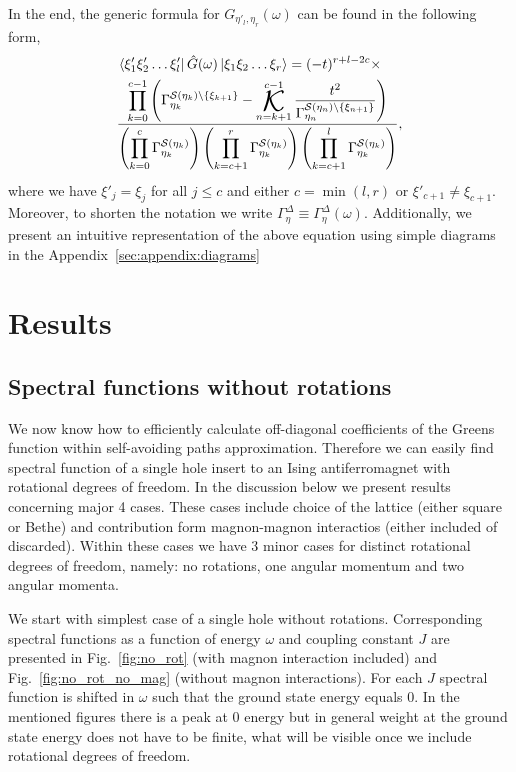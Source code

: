 \documentclass[%
 reprint,
 amsmath,amssymb,
 aps,
prb,
floatfix,
]{revtex4-1}
\newcommand{\ket}[1]{\left\vert #1 \right\rangle}
\newcommand{\bra}[1]{\left\langle #1 \right\vert}
\def\K{%
    \operatornamewithlimits{%
        \mathchoice{%
            \vcenter{\hbox{\huge $\mathcal{K}$}}%
        }{%
            \vcenter{\hbox{\Large $\mathcal{K}$}}%
        }{%
            \mathrm{\mathcal{K}}%
        }{%
            \mathrm{\mathcal{K}}%
        }
    }
}
\begin{document}
In the end, the generic formula for $G_{\eta'_l, \eta_r}(\omega)$ can be found in the following form, 
\begin{equation}\label{eq:GFcoef}
	\begin{split}
		&\bra{\xi'_1 \xi'_2 \hdots \xi'_l}
		\hat{G}(\omega)
		\ket{\xi_1 \xi_2 \hdots \xi_r} = (-t)^{r + l - 2c} \times \\
		&\frac{\displaystyle
		\prod_{k=0}^{c-1} \left(
			\Gamma_{\eta_k}^{\mathcal{S}(\eta_k)\setminus\{\xi_{k+1}\}} - \K_{n=k+1}^{c-1} \frac{t^2}{\Gamma_{\eta_n}^{\mathcal{S}(\eta_n)\setminus\{\xi_{n+1}\}}}
		\right)
		}{\displaystyle
		\left(
			\prod_{k=0}^{c} \Gamma_{\eta_k}^{\mathcal{S}(\eta_k)}
		\right)
		\left(
			\prod_{k=c+1}^{r} \Gamma_{\eta_k}^{\mathcal{S}(\eta_k)}
		\right)
		\left(
			\prod_{k=c+1}^{l} \Gamma_{\eta_k}^{\mathcal{S}(\eta_k)}
		\right)
		},    
	\end{split}
\end{equation}
where we have $\xi'_j = \xi_j$ for all $j \leq c$ and either $c = \min(l,r)$ or $\xi'_{c+1} \neq \xi_{c+1}$. Moreover, to shorten the notation we write $\Gamma_\eta^\Delta \equiv \Gamma_\eta^\Delta(\omega)$. Additionally, we present an intuitive representation of the above equation using simple diagrams in the Appendix~\ref{sec:appendix:diagrams}

\section{\label{sec:results}Results}

\subsection{\label{sec:results:no_rot}Spectral functions without rotations}

We now know how to efficiently calculate off-diagonal coefficients of the Greens function within self-avoiding paths approximation. Therefore we can easily find spectral function of a single hole insert to an Ising antiferromagnet with rotational degrees of freedom. In the discussion below we present results concerning major 4 cases. These cases include choice of the lattice (either square or Bethe) and contribution form magnon-magnon interactios (either included of discarded). Within these cases we have 3 minor cases for distinct rotational degrees of freedom, namely: no rotations, one angular momentum and two angular momenta.

We start with simplest case of a single hole without rotations. Corresponding spectral functions as a function of energy $\omega$ and coupling constant $J$ are presented in Fig.~\ref{fig:no_rot} (with magnon interaction included) and Fig.~\ref{fig:no_rot_no_mag} (without magnon interactions). For each $J$ spectral function is shifted in $\omega$ such that the ground state energy equals 0. In the mentioned figures there is a peak at 0 energy but in general weight at the ground state energy does not have to be finite, what will be visible once we include rotational degrees of freedom.
\end{document}
